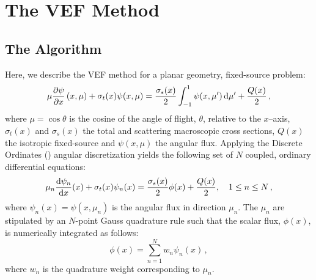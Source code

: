 
\newcommand{\rell}{^\ell} %
\newcommand{\relll}{^{\ell+1}} %
\newcommand{\rellh}{^{\ell+1/2}} %

\newcommand{\paren}[1]{\left(#1\right)} 
\newcommand{\br}[1]{\left[#1\right]}
\newcommand{\curl}[1]{\left\{#1\right\}}

\newcommand{\eddphi}[1]{\edd_{#1}\phi_{#1}}
\newcommand{\ALPHA}[2]{\frac{#1}{\sigma_{t,#2} h_{#2}}}

\section{The VEF Method}
\subsection{The Algorithm}
Here, we describe the VEF method for a planar geometry, fixed-source problem:
	\begin{equation} 
		\mu \pderiv{\psi}{x} \paren{x, \mu} + \sigma_t(x) \psi(x,\mu) = 
			\frac{\sigma_s(x)}{2} \int_{-1}^1 \psi(x,\mu') \ud \mu' + \frac{Q(x)}{2} \,,
	\end{equation}
where $\mu = \cos\theta$ is the cosine of the angle of flight, $\theta$, relative to the $x$--axis, $\sigma_t(x)$ and $\sigma_s(x)$ the total and scattering macroscopic cross sections, $Q(x)$ the isotropic fixed-source and $\psi(x, \mu)$ the angular flux. Applying the Discrete Ordinates (\SN) angular discretization yields the following set of $N$ coupled, ordinary differential equations: 
	\begin{equation} \label{eq:sn}
		\mu_n \frac{\mathop{}\!\mathrm{d} \psi_n}{\mathop{}\!\mathrm{d} x}(x) + \sigma_t(x) \psi_n(x) = 
		\frac{\sigma_s(x)}{2} \phi(x) + \frac{Q(x)}{2}, \quad 1 \leq n \leq N \,,
	\end{equation}
where $\psi_n(x) = \psi(x, \mu_n)$ is the angular flux in direction $\mu_n$. The $\mu_n$ are stipulated by an $N$-point Gauss quadrature rule such that the scalar flux, $\phi(x)$, is numerically integrated as follows: 
	\begin{equation} \label{eq:phiquad}
		\phi(x) = \sum_{n=1}^N w_n \psi_n(x) \,,
	\end{equation}
where $w_n$ is the quadrature weight corresponding to $\mu_n$. 


